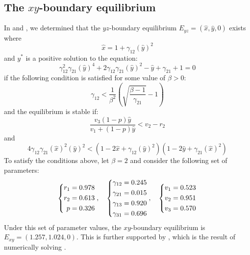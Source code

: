 \subsection{The $xy$-boundary equilibrium}\label{subsec:numsim_xy_boundary_equilibrium}
In  and , we determined that the $yz$-boundary equilibrium $E_{yz}=\left(\hat{x},\hat{y},0\right)$ exists where
\[
\hat{x}=1+\gamma_{12}\left(\hat{y}\right)^2
\]
and $y^*$ is a positive solution to the equation:
\[
\gamma_{12}^2\gamma_{21}\left(\hat{y}\right)^4+2\gamma_{12}\gamma_{21}\left(\hat{y}\right)^2-\hat{y}+\gamma_{21}+1=0
\]
if the following condition is satisfied for some value of $\beta>0$:
\[
\gamma_{12}<\frac1{\beta^2}\left(\sqrt{\frac{\beta-1}{\gamma_{21}}}-1\right)
\]
and the equilibrium is stable if:
\[
\frac{v_3\left(1-p\right)\hat{y}}{v_1+\left(1-p\right)\hat{y}}<v_2-r_2
\]
and
\[
4\gamma_{12}\gamma_{21}\left(\hat{x}\right)^2\left(\hat{y}\right)^2<\left(1-2\hat{x}+\gamma_{12}\left(\hat{y}\right)^2\right)\left(1-2\hat{y}+\gamma_{21}\left(\hat{x}\right)^2\right)
\]
To satisfy the conditions above, let $\beta=2$ and consider the following set of parameters:
\begin{equation}
    \begin{dcases}
        \begin{aligned}
            r_1 &= 0.978\\
            r_2 &= 0.613\\
            p &= 0.326
        \end{aligned}
    \end{dcases},\quad 
    \begin{dcases}
        \begin{aligned}
            \gamma_{12} &= 0.245\\
            \gamma_{21} &= 0.015\\
            \gamma_{13} &= 0.920\\
            \gamma_{31} &= 0.696
        \end{aligned}
    \end{dcases},\quad
    \begin{dcases}
        \begin{aligned}
            v_1 &= 0.523\\
            v_2 &= 0.951\\
            v_3 &= 0.570
        \end{aligned}
    \end{dcases} 
    \label{params:6.2}
\end{equation}
Under this set of parameter values, the $xy$-boundary equilibrium is $E_{xy}=(1.257,1.024,0)$. This is further supported by , which is the result of numerically solving .

